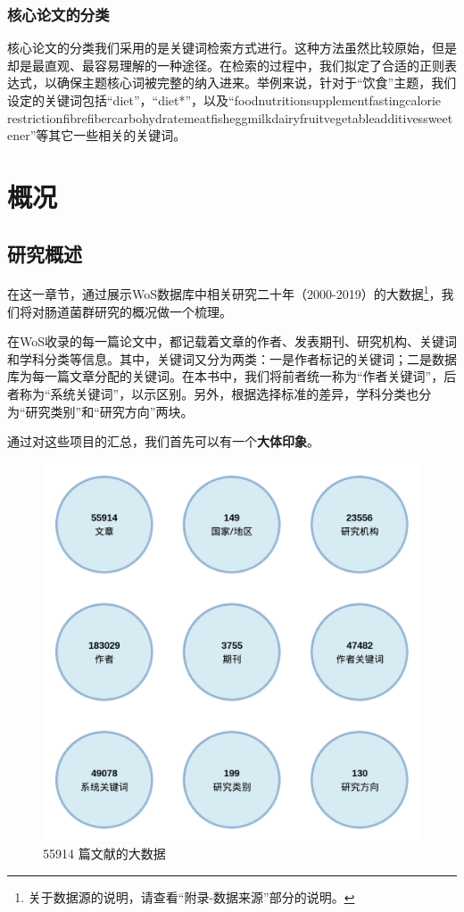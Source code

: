 \documentclass[]{ctexbook}
\begin{document}
\hypertarget{ux6838ux5fc3ux8bbaux6587ux7684ux5206ux7c7b}{%
\section{核心论文的分类}\label{ux6838ux5fc3ux8bbaux6587ux7684ux5206ux7c7b}}

核心论文的分类我们采用的是关键词检索方式进行。这种方法虽然比较原始，但是却是最直观、最容易理解的一种途径。在检索的过程中，我们拟定了合适的正则表达式，以确保主题核心词被完整的纳入进来。举例来说，针对于``饮食''主题，我们设定的关键词包括``diet''，``diet*''，以及``food\textbar nutrition\textbar supplement\textbar fasting\textbar calorie restriction\textbar fibre\textbar fiber\textbar carbohydrate\textbar meat\textbar fish\textbar egg\textbar milk\textbar dairy\textbar fruit\textbar vegetable\textbar additives\textbar sweetener''等其它一些相关的关键词。

\hypertarget{part-ux6982ux51b5}{%
\part{概况}\label{part-ux6982ux51b5}}

\hypertarget{intro}{%
\chapter{研究概述}\label{intro}}

在这一章节，通过展示WoS数据库中相关研究二十年（2000-2019）的大数据\footnote{关于数据源的说明，请查看``附录-数据来源''部分的说明。}，我们将对肠道菌群研究的概况做一个梳理。

在WoS收录的每一篇论文中，都记载着文章的作者、发表期刊、研究机构、关键词和学科分类等信息。其中，关键词又分为两类：一是作者标记的关键词；二是数据库为每一篇文章分配的关键词。在本书中，我们将前者统一称为``作者关键词''，后者称为``系统关键词''，以示区别。另外，根据选择标准的差异，学科分类也分为``研究类别''和``研究方向''两块。

通过对这些项目的汇总，我们首先可以有一个\textbf{大体印象}。

\begin{figure}
\includegraphics[width=0.7\linewidth]{plots/M-summary-1} \caption{55914 篇文献的大数据}\label{fig:M-summary}
\end{figure}
\end{document}
